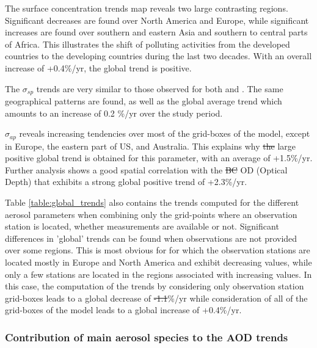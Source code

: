 \documentclass[acp, manuscript]{copernicus}
\providecommand{\DIFadd}[1]{{\protect\color{blue}\uwave{#1}}} %
\providecommand{\DIFdel}[1]{{\protect\color{red}\sout{#1}}}                      %
\providecommand{\DIFaddbegin}{} %
\providecommand{\DIFaddend}{} %
\providecommand{\DIFdelbegin}{} %
\providecommand{\DIFdelend}{} %
\begin{document}
The surface  concentration trends map reveals two large contrasting regions. Significant decreases are found over North America and Europe, while significant increases are found over southern and eastern Asia and southern to central parts of Africa. This illustrates the shift of polluting activities from the developed countries to the developing countries during the last two decades. With an overall increase of +0.4\%/yr, the global trend is positive.

The $\sigma_{sp}$ trends are very similar to those observed for both  and . The same geographical patterns are found, as well as the global average trend which amounts to an increase of 0.2 \%/yr over the study period.

$\sigma_{ap}$ reveals increasing tendencies over most of the grid-boxes of the model, except in Europe, the eastern part of \DIFaddbegin \DIFadd{the }\DIFaddend US, and Australia. This explains why \DIFdelbegin \DIFdel{the }\DIFdelend \DIFaddbegin \DIFadd{a }\DIFaddend large positive global trend is obtained for this parameter, with an average of +1.5\%/yr. Further analysis shows a good spatial correlation with the \DIFdelbegin \DIFdel{BC }\DIFdelend \DIFaddbegin \DIFadd{black carbon }\DIFaddend OD (Optical Depth) that exhibits a strong global positive trend of +2.3\%/yr\DIFaddbegin \DIFadd{, as discussed below}\DIFaddend .

Table \ref{table:global_trends} also contains the trends computed for the different aerosol parameters when combining only the grid-points where an observation station is located, whether measurements are available or not. Significant differences in 'global' trends can be found when observations are not provided over some regions. This is most obvious for  for which the observation stations are located mostly in Europe and North America and exhibit decreasing values, while only a few stations are located in the regions associated with increasing values. In this case, the computation of the trends by considering only observation station grid-boxes leads to a global decrease of \DIFdelbegin \DIFdel{-1.1}\DIFdelend \DIFaddbegin \DIFadd{-3.9}\DIFaddend \%/yr while consideration of all of the grid-boxes of the model leads to a global increase of +0.4\%/yr.


\subsubsection{Contribution of main aerosol species to the AOD trends}
\end{document}
